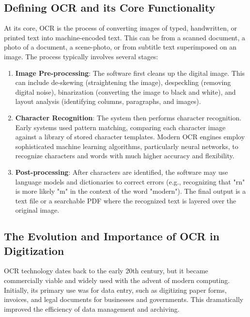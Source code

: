 \subsection{Defining OCR and its Core Functionality}
\label{subsec:defining-ocr}
At its core, \gls{OCR} is the process of converting images of typed, handwritten, or printed text into machine-encoded text. This can be from a scanned document, a photo of a document, a scene-photo, or from subtitle text superimposed on an image. The process typically involves several stages:
\begin{enumerate}
	\item \textbf{Image Pre-processing}: The software first cleans up the digital image. This can include de-skewing (straightening the image), despeckling (removing digital noise), binarization (converting the image to black and white), and layout analysis (identifying columns, paragraphs, and images).
	\item \textbf{Character Recognition}: The system then performs character recognition. Early systems used pattern matching, comparing each character image against a library of stored character templates. Modern OCR engines employ sophisticated machine learning algorithms, particularly neural networks, to recognize characters and words with much higher accuracy and flexibility.
	\item \textbf{Post-processing}: After characters are identified, the software may use language models and dictionaries to correct errors (e.g., recognizing that "rn" is more likely "m" in the context of the word "modern"). The final output is a text file or a searchable PDF where the recognized text is layered over the original image.
\end{enumerate}

\subsection{The Evolution and Importance of OCR in Digitization}
\label{subsec:ocr-evolution}
OCR \gls{technology} dates back to the early 20th century, but it became commercially viable and widely used with the advent of modern computing. Initially, its primary use was for data entry, such as digitizing paper forms, invoices, and legal documents for businesses and governments. This dramatically improved the efficiency of data management and archiving.

